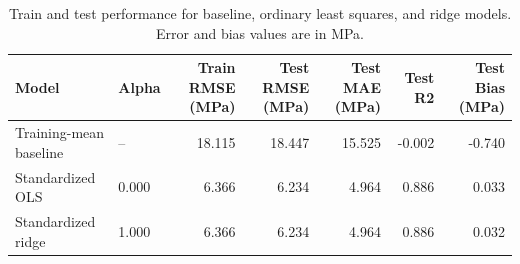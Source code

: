 \begin{table}
\caption{Train and test performance for baseline, ordinary least squares, and ridge models. Error and bias values are in MPa.}
\label{tab:model-performance}
\begin{tabular}{llrrrrr}
\toprule
Model & Alpha & Train RMSE (MPa) & Test RMSE (MPa) & Test MAE (MPa) & Test R2 & Test Bias (MPa) \\
\midrule
Training-mean baseline & -- & 18.115 & 18.447 & 15.525 & -0.002 & -0.740 \\
Standardized OLS & 0.000 & 6.366 & 6.234 & 4.964 & 0.886 & 0.033 \\
Standardized ridge & 1.000 & 6.366 & 6.234 & 4.964 & 0.886 & 0.032 \\
\bottomrule
\end{tabular}
\end{table}
